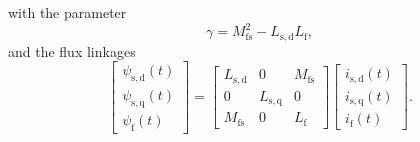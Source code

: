 \begin{solutionblock}
    with the parameter 
    \begin{equation}
        \gamma = M_{\mathrm{fs}}^2-L_{\mathrm{s,d}}L_{\mathrm{f}},
    \end{equation}
    and the flux linkages
    \begin{equation}
        \begin{bmatrix}
            \psi_{\mathrm{s,d}}(t) \\
            \psi_{\mathrm{s,q}}(t) \\
            \psi_{\mathrm{f}}(t)
        \end{bmatrix}
        =
        \begin{bmatrix}
            L_{\mathrm{s,d}}  & 0     & M_{\mathrm{fs}} \\
            0       & L_{\mathrm{s,q}}    & 0 \\
            M_{\mathrm{fs}}     & 0     & L_{\mathrm{f}}
        \end{bmatrix}
        \begin{bmatrix}
            i_{\mathrm{s,d}}(t) \\
            i_{\mathrm{s,q}}(t) \\
            i_{\mathrm{f}}(t)
        \end{bmatrix}.
    \end{equation}




\end{solutionblock}
